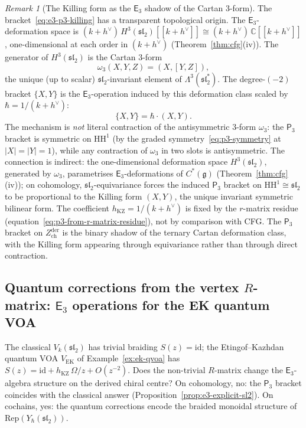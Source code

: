 \documentclass[11pt,reqno]{amsart}
\theoremstyle{definition}
\theoremstyle{remark}
\newtheorem{remark}[theorem]{Remark}
\newcommand{\HH}{\mathrm{HH}}
\newcommand{\Ethree}{\mathsf{E}_{3}}
\newcommand{\Pthree}{\mathsf{P}_{3}}
\newcommand{\fg}{\mathfrak{g}}
\newcommand{\CC}{\mathbb{C}}
\newcommand{\id}{\mathrm{id}}
\numberwithin{equation}{section}
\begin{document}
\begin{remark}[The Killing form as the $\Ethree$ shadow
of the Cartan $3$-form]
\label{rem:cartan-3-form}
The bracket~\eqref{eq:e3-p3-killing} has a transparent
topological origin. The $\Ethree$-deformation space is
$(k+h^\vee)\,H^3(\mathfrak{sl}_2)[[k+h^\vee]] \cong (k+h^\vee)\,\CC[[k+h^\vee]]$,
one-dimensional at each order in $(k+h^\vee)$
(Theorem~\ref{thm:cfg}(iv)). The generator of
$H^3(\mathfrak{sl}_2)$ is the Cartan $3$-form
\begin{equation}\label{eq:cartan-3form}
  \omega_3(X, Y, Z)
  = (X, [Y, Z]),
\end{equation}
the unique (up to scalar) $\mathfrak{sl}_2$-invariant element
of $\Lambda^3(\mathfrak{sl}_2^*)$. The degree-$(-2)$ bracket
$\{X, Y\}$ is the $\Ethree$-operation induced by this
deformation class scaled by
$\hbar = 1/(k + h^\vee)$:
\[
  \{X, Y\}
  = \hbar \cdot (X, Y).
\]
The mechanism is \emph{not} literal contraction of the
antisymmetric $3$-form $\omega_3$: the $\Pthree$ bracket
is symmetric on $\HH^1$ (by the graded
symmetry~\eqref{eq:p3-symmetry} at $|X| = |Y| = 1$),
while any contraction of $\omega_3$ in two slots is
antisymmetric. The connection is indirect:
the one-dimensional deformation space
$H^3(\mathfrak{sl}_2)$, generated by $\omega_3$,
parametrises $\Ethree$-deformations of $C^*(\fg)$
(Theorem~\ref{thm:cfg}(iv));
on cohomology, $\mathfrak{sl}_2$-equivariance forces
the induced $\Pthree$ bracket on
$\HH^1 \cong \mathfrak{sl}_2$ to be proportional to
the Killing form $(X, Y)$, the unique invariant
symmetric bilinear form. The coefficient
$h_{\mathrm{KZ}} = 1/(k + h^\vee)$ is fixed by the
$r$-matrix residue
(equation~\eqref{eq:p3-from-r-matrix-residue}), not by
comparison with CFG.
The $\Pthree$ bracket on $Z^{\mathrm{der}}_{\mathrm{ch}}$
is the binary shadow of the ternary Cartan deformation class,
with the Killing form appearing through equivariance rather
than through direct contraction.
\end{remark}

\subsection{Quantum corrections from the vertex $R$-matrix:
$\Ethree$ operations for the EK quantum VOA}
\label{subsec:e3-ek-quantum}

The classical $V_k(\mathfrak{sl}_2)$ has trivial braiding
$S(z) = \id$; the Etingof--Kazhdan quantum VOA
$V_{\mathrm{EK}}$ of Example~\ref{ex:ek-qvoa} has
$S(z) = \id + h_{\mathrm{KZ}}\,\Omega/z + O(z^{-2})$. Does
the non-trivial $R$-matrix change the $\Ethree$-algebra
structure on the derived chiral centre? On cohomology, no:
the $\Pthree$ bracket coincides with the classical answer
(Proposition~\ref{prop:e3-explicit-sl2}). On cochains, yes:
the quantum corrections encode the braided monoidal structure
of $\mathrm{Rep}(Y_\hbar(\mathfrak{sl}_2))$.
\end{document}
